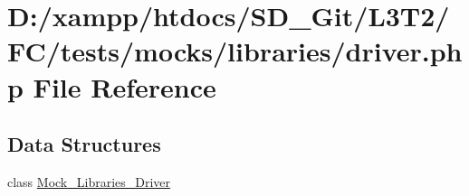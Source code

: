 \hypertarget{tests_2mocks_2libraries_2_driver_8php}{}\section{D\+:/xampp/htdocs/\+S\+D\+\_\+\+Git/\+L3\+T2/\+F\+C/tests/mocks/libraries/driver.php File Reference}
\label{tests_2mocks_2libraries_2_driver_8php}
\subsection*{Data Structures}
\begin{DoxyCompactItemize}
\item 
class \hyperlink{class_mock___libraries___driver}{Mock\+\_\+\+Libraries\+\_\+\+Driver}
\end{DoxyCompactItemize}
